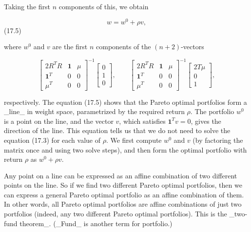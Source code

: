 Taking the first \(n\) components of this, we obtain

\[w=w^{0}+\rho v,\] (17.5)

where \(w^{0}\) and \(v\) are the first \(n\) components of the \((n+2)\)-vectors

\[\left[\begin{array}{ccc}2R^{T}R&\mathbf{1}&\mu\\ \mathbf{1}^{T}&0&0\\ \mu^{T}&0&0\end{array}\right]^{-1}\left[\begin{array}{c}0\\ 1\\ 0\end{array}\right],\qquad\left[\begin{array}{ccc}2R^{T}R&\mathbf{1}&\mu\\ \mathbf{1}^{T}&0&0\\ \mu^{T}&0&0\end{array}\right]^{-1}\left[\begin{array}{c}2T\mu\\ 0\\ 1\end{array}\right],\]

respectively. The equation (17.5) shows that the Pareto optimal portfolios form a _line_ in weight space, parametrized by the required return \(\rho\). The portfolio \(w^{0}\) is a point on the line, and the vector \(v\), which satisfies \(\mathbf{1}^{T}v=0\), gives the direction of the line. This equation tells us that we do not need to solve the equation (17.3) for each value of \(\rho\). We first compute \(w^{0}\) and \(v\) (by factoring the matrix once and using two solve steps), and then form the optimal portfolio with return \(\rho\) as \(w^{0}+\rho v\).

Any point on a line can be expressed as an affine combination of two different points on the line. So if we find two different Pareto optimal portfolios, then we can express a general Pareto optimal portfolio as an affine combination of them. In other words, all Pareto optimal portfolios are affine combinations of just two portfolios (indeed, any two different Pareto optimal portfolios). This is the _two-fund theorem_. (_Fund_ is another term for portfolio.)